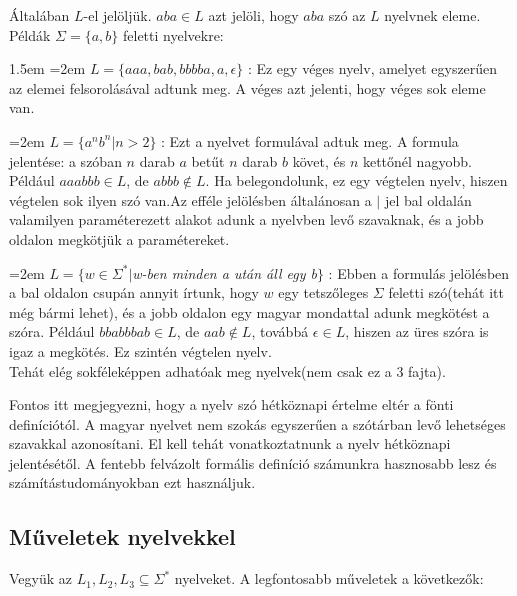 \documentclass[12pt]{report}
\theoremstyle{definition}
\begin{document}
Általában $L$-el jelöljük. $aba\in L$ azt jelöli, hogy $aba$ szó az $L$ nyelvnek eleme.\\

Példák $\Sigma=\{a,b\}$ feletti nyelvekre:

\begingroup
\leftskip1.5em
\rightskip\leftskip
\noindent
\hangindent=2em
$L = \{aaa,bab,bbbba,a,\epsilon\}$ : Ez egy véges nyelv, amelyet egyszerűen az elemei felsorolásával adtunk meg. A véges azt jelenti, hogy véges sok eleme van.

\noindent
\hangindent=2em
$L = \{a^nb^n|n>2\}$ : Ezt a nyelvet formulával adtuk meg. A formula jelentése: a szóban $n$ darab $a$ betűt $n$ darab $b$ követ, és $n$ kettőnél nagyobb. Például $aaabbb\in L$, de $abbb\notin L$. Ha belegondolunk, ez egy végtelen nyelv, hiszen végtelen sok ilyen szó van.Az efféle jelölésben általánosan a $|$ jel bal oldalán valamilyen paraméterezett alakot adunk a nyelvben levő szavaknak, és a jobb oldalon megkötjük a paramétereket.

\noindent
\hangindent=2em
$L = \{w \in \Sigma^*|$\textit{w-ben minden a után áll egy b}$\}$ : Ebben a formulás jelölésben a bal oldalon csupán annyit írtunk, hogy $w$ egy tetszőleges $\Sigma$ feletti szó(tehát itt még bármi lehet), és a jobb oldalon egy magyar mondattal adunk megkötést a szóra. Például $bbabbbab\in L$, de $aab\notin L$, továbbá $\epsilon\in L$, hiszen az üres szóra is igaz a megkötés. Ez szintén végtelen nyelv.
\\

\endgroup
Tehát elég sokféleképpen adhatóak meg nyelvek(nem csak ez a 3 fajta).

Fontos itt megjegyezni, hogy a nyelv szó hétköznapi értelme eltér a fönti definíciótól. A magyar nyelvet nem szokás egyszerűen a szótárban levő lehetséges szavakkal azonosítani. El kell tehát vonatkoztatnunk a nyelv hétköznapi jelentésétől. A fentebb felvázolt formális definíció számunkra hasznosabb lesz és számítástudományokban ezt használjuk.

\subsection{Műveletek nyelvekkel}
Vegyük az $L_1,L_2,L_3 \subseteq \Sigma^*$ nyelveket. A legfontosabb műveletek a következők:
\end{document}
